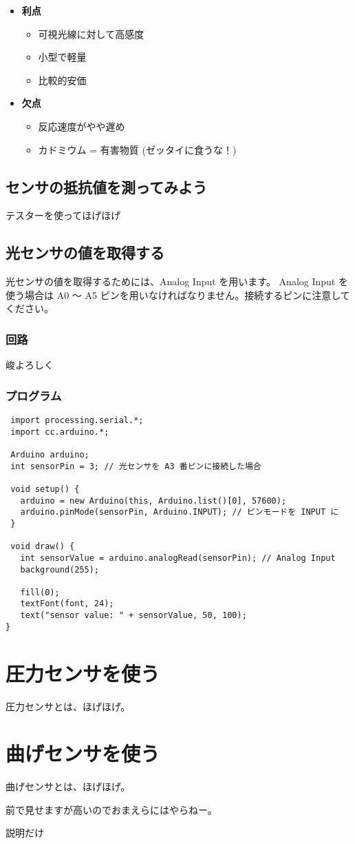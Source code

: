 \documentclass[11pt,a4paper]{jarticle}
\begin{document}
\begin{itemize}
 \item \textbf{利点}
       \begin{itemize}
	\item 可視光線に対して高感度
	\item 小型で軽量
	\item 比較的安価
       \end{itemize}
 \item \textbf{欠点}
       \begin{itemize}
	\item 反応速度がやや遅め
	\item カドミウム = 有害物質 (ゼッタイに食うな！)
       \end{itemize}
\end{itemize}


\subsection*{センサの抵抗値を測ってみよう}
テスターを使ってほげほげ

\subsection*{光センサの値を取得する}
光センサの値を取得するためには、Analog Input を用います。
Analog Input を使う場合は A0 〜 A5 ピンを用いなければなりません。接続するピンに注意してください。

\subsubsection*{回路}
峻よろしく

\subsubsection*{プログラム}
\begin{lstlisting}
 import processing.serial.*;
 import cc.arduino.*;
 
 Arduino arduino;
 int sensorPin = 3; // 光センサを A3 番ピンに接続した場合
 
 void setup() {
   arduino = new Arduino(this, Arduino.list()[0], 57600);
   arduino.pinMode(sensorPin, Arduino.INPUT); // ピンモードを INPUT に
 }

 void draw() {
   int sensorValue = arduino.analogRead(sensorPin); // Analog Input
   background(255);

   fill(0);
   textFont(font, 24);
   text("sensor value: " + sensorValue, 50, 100);
}
\end{lstlisting}


\section{圧力センサを使う}
圧力センサとは、ほげほげ。

\section{曲げセンサを使う}
曲げセンサとは、ほげほげ。

前で見せますが高いのでおまえらにはやらねー。

説明だけ
\end{document}
